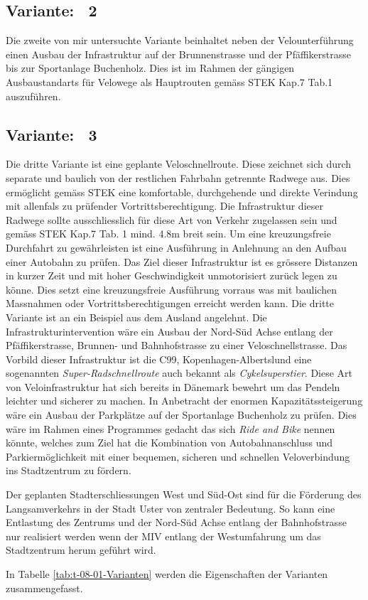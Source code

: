 \subsection{Variante: \ 2}
\label{subsec:V2}
	
Die zweite von mir untersuchte Variante beinhaltet neben der Velounterführung einen Ausbau der Infrastruktur auf der Brunnenstrasse und der Pfäffikerstrasse bis zur Sportanlage Buchenholz. Dies ist im Rahmen der gängigen Ausbaustandarts für Velowege als Hauptrouten gemäss STEK Kap.7 Tab.1 auszuführen.

\subsection{Variante: \ 3}
\label{subsec:V3}

Die dritte Variante ist eine geplante Veloschnellroute. 
Diese zeichnet sich durch separate und baulich von der restlichen Fahrbahn getrennte Radwege aus. Dies ermöglicht gemäss STEK eine komfortable, durchgehende und direkte Verindung mit allenfals zu prüfender Vortrittsberechtigung. Die Infrastruktur dieser Radwege sollte ausschliesslich für diese Art von Verkehr zugelassen sein und gemäss STEK Kap.7 Tab. 1 mind. 4.8m breit sein. Um eine kreuzungsfreie Durchfahrt zu gewährleisten ist eine Ausführung in Anlehnung an den Aufbau einer Autobahn zu prüfen.  
Das Ziel dieser Infrastruktur ist es grössere Distanzen in kurzer Zeit und mit hoher Geschwindigkeit unmotorisiert zurück legen zu könne. Dies setzt eine kreuzungsfreie Ausführung vorraus was mit baulichen Massnahmen oder Vortrittsberechtigungen erreicht werden kann.
Die dritte Variante ist an ein Beispiel aus dem Ausland angelehnt. Die Infrastrukturintervention wäre ein Ausbau der Nord-Süd Achse entlang der Pfäffikerstrasse, Brunnen- und Bahnhofstrasse zu einer Veloschnellstrasse. 
Das Vorbild dieser Infrastruktur ist die C99, Kopenhagen-Albertslund eine sogenannten \textit{Super-Radschnellroute} auch bekannt als \textit{Cykelsuperstier}. Diese Art von Veloinfrastruktur hat sich bereits in Dänemark bewehrt um das Pendeln leichter und sicherer zu machen. 
In Anbetracht der enormen Kapazitätssteigerung wäre ein Ausbau der Parkplätze auf der Sportanlage Buchenholz zu prüfen. Dies wäre im Rahmen eines Programmes gedacht das sich \textit{Ride and Bike} nennen könnte, welches zum Ziel hat die Kombination von Autobahnanschluss und Parkiermöglichkeit mit einer bequemen, sicheren und schnellen Veloverbindung ins Stadtzentrum zu fördern. 

Der geplanten Stadterschliessungen West und Süd-Ost sind für die Förderung des Langsamverkehrs in der Stadt Uster von zentraler Bedeutung. So kann eine Entlastung des Zentrums und der Nord-Süd Achse entlang der Bahnhofstrasse nur realisiert werden wenn der MIV entlang der Westumfahrung um das Stadtzentrum herum geführt wird. 

In Tabelle \ref{tab:t-08-01-Varianten} werden die Eigenschaften der Varianten zusammengefasst.


\pagebreak

%

